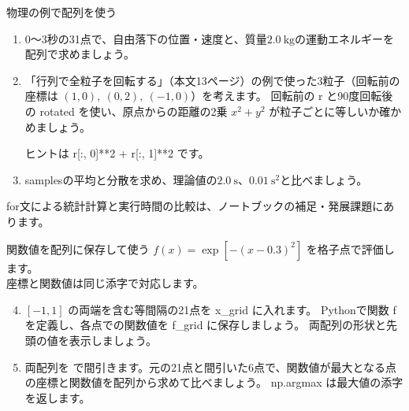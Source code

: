 \documentclass[12pt,aspectratio=43]{beamer}
\newcommand{\code}[1]{{\codefont #1}}
\begin{document}
\begin{frame}[t]{物理の例で配列を使う}
  \setlength{\parskip}{0pt}
  \small
  \begin{enumerate}
    \setlength{\itemsep}{3mm}
    \item \(0\)〜\(3\)秒の31点で、自由落下の位置・速度と、質量\(2.0\ \mathrm{kg}\)の運動エネルギーを配列で求めましょう。
    \item 「行列で全粒子を回転する」（本文13ページ）の例で使った3粒子（回転前の座標は \((1,0),\ (0,2),\ (-1,0)\)）を考えます。
      回転前の \code{r} と90度回転後の \code{rotated} を使い、原点からの距離の2乗 \(x^2+y^2\) が粒子ごとに等しいか確かめましょう。
      \par ヒントは \code{r[:, 0]**2 + r[:, 1]**2} です。
    \item \code{samples}の平均と分散を求め、理論値の\(2.0\ \mathrm{s}\)、\(0.01\ \mathrm{s^2}\)と比べましょう。
  \end{enumerate}
  \vfill
  {\small \code{for}文による統計計算と実行時間の比較は、ノートブックの補足・発展課題にあります。}
\end{frame}

\begin{frame}[t]{関数値を配列に保存して使う}
  \setlength{\parskip}{0pt}
  \small
  \(f(x)=\exp[-(x-0.3)^2]\) を格子点で評価します。\\
  座標と関数値は同じ添字で対応します。
  \begin{enumerate}
    \setcounter{enumi}{3}
    \setlength{\itemsep}{3mm}
    \item \([-1,1]\) の両端を含む等間隔の21点を \code{x\_grid} に入れます。
      Pythonで関数 \code{f} を定義し、各点での関数値を \code{f\_grid} に保存しましょう。
      両配列の形状と先頭の値を表示しましょう。
    \item 両配列を \code{[::4]} で間引きます。元の21点と間引いた6点で、関数値が最大となる点の座標と関数値を配列から求めて比べましょう。
      \code{np.argmax} は最大値の添字を返します。
  \end{enumerate}
\end{frame}
\end{document}
